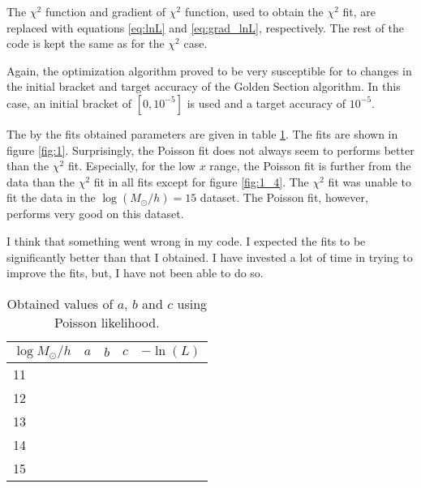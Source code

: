 The $\chi^2$ function and gradient of $\chi^2$ function, used to obtain the $\chi^2$ fit, are replaced with equations \ref{eq:lnL} and \ref{eq:grad_lnL}, respectively. The rest of the code is kept the same as for the $\chi^2$ case.

Again, the optimization algorithm proved to be very susceptible for to changes in the initial bracket and target accuracy of the Golden Section algorithm. In this case, an initial bracket of $[0, 10^{-5}]$ is used and a target accuracy of $10^{-5}$.

The by the fits obtained parameters are given in table \ref{tab:poisson}. The fits are shown in figure \ref{fig:1}. Surprisingly, the Poisson fit does not always seem to performs better than the $\chi^2$ fit. Especially, for the low $x$ range, the Poisson fit is further from the data than the $\chi^2$ fit in all fits except for figure \ref{fig:1_4}. The $\chi^2$ fit was unable to fit the data in the $\log(M_\odot/h)=15$ dataset. The Poisson fit, however, performs very good on this dataset.

I think that something went wrong in my code. I expected the fits to be significantly better than that I obtained. I have invested a lot of time in trying to improve the fits, but, I have not been able to do so. 


\begin{table}[h]
    \caption{Obtained values of $a$, $b$ and $c$ using Poisson likelihood.}
    \label{tab:poisson}
    \centering
    \begin{tabular}{l|llll}
    $\log M_\odot/h$ & {$a$} & $b$ & $c$ & $-\ln(L)$                                              \\ \hline
    11          &  &  &  &  \\
    12          &  &  &  &  \\
    13          &  &  &  &  \\
    14          &  &  &  &  \\
    15          &  &  &  & 
    \end{tabular}
\end{table}

